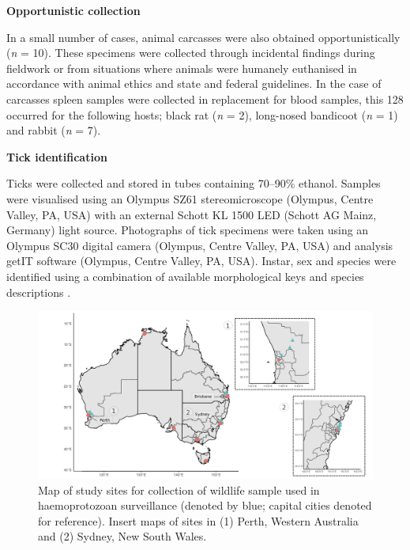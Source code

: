 \documentclass[a4paper, nobind]{templates/ociamthesis}
\begin{document}
\textbf{Opportunistic collection}

In a small number of cases, animal carcasses were also obtained opportunistically (\emph{n} = 10).
These specimens were collected through incidental findings during fieldwork or from situations where animals were humanely euthanised in accordance with animal ethics and state and federal guidelines.
In the case of carcasses spleen samples were collected in replacement for blood samples, this
128 occurred for the following hosts; black rat (\emph{n} = 2), long-nosed bandicoot (\emph{n} = 1) and rabbit (\emph{n} = 7).

\textbf{Tick identification}

Ticks were collected and stored in tubes containing 70--90\% ethanol. Samples were visualised using an Olympus SZ61 stereomicroscope (Olympus, Centre Valley, PA, USA) with an external Schott KL 1500 LED (Schott AG Mainz, Germany) light source. Photographs of tick specimens were taken using an Olympus SC30 digital camera (Olympus, Centre Valley, PA, USA) and analysis getIT software (Olympus, Centre Valley, PA, USA).
Instar, sex and species were identified using a combination of available morphological keys and species descriptions \autocite{robertsAustralianTicks1970,jacksonMorphologicalComparisonAdult2002,laanObservationsBiologyDistribution2011,barkerTicksAustraliaSpecies2014,kwakPhylogeneticAnalysisAustralian2017}.

\begin{figure}
\includegraphics[width=0.95\linewidth]{figures/ms-figs/Ch4-map} \caption[Map of study sites for wildlife samples.]{Map of study sites for collection of wildlife sample used in haemoprotozoan surveillance (denoted by blue; capital cities denoted for reference). Insert maps of sites in (1) Perth, Western Australia and (2) Sydney, New South Wales.}\label{fig:Ch4map}
\end{figure}
\end{document}
